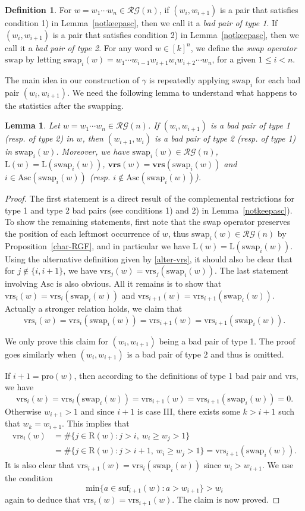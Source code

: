 \documentclass[12pt]{amsart}
\numberwithin{equation}{section}
\theoremstyle{plain}
\newtheorem{lemma}[theorem]{Lemma}
\theoremstyle{definition}
\newtheorem{Def}[theorem]{Definition}
\def\wrs{\mathrm{vrs}}
\def\pl{\mathrm{pro}}
\def\Asc{\mathrm{Asc}}
\def\LL{\mathrm{L}}
\def\RR{\mathrm{R}}
\def\bwrs{\mathbf{vrs}}
\def\swap{\mathrm{swap}}
\def\suf{\mathrm{suf}}
\def\min{\mathrm{min}}
\def\RG{\mathcal{RG}}
\begin{document}
\begin{Def}\label{badpair}
For $w=w_1\cdots w_n\in\RG(n)$, if $(w_i,w_{i+1})$ is a pair that satisfies condition 1) in Lemma~\ref{notkeepasc}, then we call it a \emph{bad pair of type 1}. If $(w_i,w_{i+1})$ is a pair that satisfies condition 2) in Lemma~\ref{notkeepasc}, then we call it a \emph{bad pair of type 2}. For any word $w\in [k]^n$, we define the \emph{swap operator} $\swap$ by letting $\swap_i(w)=w_1\cdots w_{i-1}w_{i+1}w_iw_{i+2}\cdots w_n$, for a given $1\le i<n$.
\end{Def}

The main idea in our construction of $\gamma$ is repeatedly applying $\swap_i$ for each bad pair $(w_i,w_{i+1})$. We need the following lemma to understand what happens to the statistics after the swapping.

\begin{lemma}\label{stat-swap}
Let $w=w_1\cdots w_n\in\RG(n)$. If $(w_i,w_{i+1})$ is a bad pair of type 1 (resp. of type 2) in $w$, then $(w_{i+1},w_i)$ is a bad pair of type 2 (resp. of type 1) in $\swap_i(w)$. Moreover, we have $\swap_i(w)\in\RG(n)$, $\LL(w)=\LL(\swap_i(w))$, $\bwrs(w)=\bwrs(\swap_i(w))$ and $i\in\Asc(\swap_i(w))$ (resp. $i\notin\Asc(\swap_i(w))$).
\end{lemma}

\begin{proof}
The first statement is a direct result of the complemental restrictions for type 1 and type 2 bad pairs (see conditions 1) and 2) in Lemma~\ref{notkeepasc}). To show the remaining statements, first note that the swap operator preserves the position of each leftmost occurrence of $w$, thus $\swap_i(w)\in \RG(n)$ by Proposition~\ref{char-RGF}, and in particular we have $\LL(w)=\LL(\swap_i(w))$. Using the alternative definition given by \eqref{alter-vrs}, it should also be clear that for $j\notin\{i,i+1\}$, we have $\wrs_j(w)=\wrs_j(\swap_i(w))$. The last statement involving $\Asc$ is also obvious. All it remains is to show that $\wrs_i(w)=\wrs_i(\swap_i(w))$ and $\wrs_{i+1}(w)=\wrs_{i+1}(\swap_i(w))$. Actually a stronger relation holds, we claim that
$$\wrs_i(w)=\wrs_i(\swap_i(w))=\wrs_{i+1}(w)=\wrs_{i+1}(\swap_i(w)).$$

We only prove this claim for $(w_i,w_{i+1})$ being a bad pair of type 1. The proof goes similarly when $(w_i,w_{i+1})$ is a bad pair of type 2 and thus is omitted.

If $i+1=\pl(w)$, then according to the definitions of type 1 bad pair and $\wrs$, we have
$$\wrs_i(w)=\wrs_i(\swap_i(w))=\wrs_{i+1}(w)=\wrs_{i+1}(\swap_i(w))=0.$$
Otherwise $w_{i+1}>1$ and since $i+1$ is case III, there exists some $k>i+1$ such that $w_k=w_{i+1}$. This implies that
\begin{align*}
\wrs_i(w)&=\#\{j \in \RR(w): j>i,~ w_i \geq w_j> 1 \}\\
&=\#\{j \in \RR(w):j>i+1,~ w_i \geq w_j> 1 \}=\wrs_{i+1}(\swap_i(w)).
\end{align*}
It is also clear that $\wrs_{i+1}(w)=\wrs_i(\swap_i(w))$ since $w_i>w_{i+1}$. We use the condition $$\min\{a \in \suf_{i+1}(w): a >w_{i+1}\}>w_i$$ again to deduce that $\wrs_i(w)=\wrs_{i+1}(w)$. The claim is now proved.
\end{proof}
\end{document}
